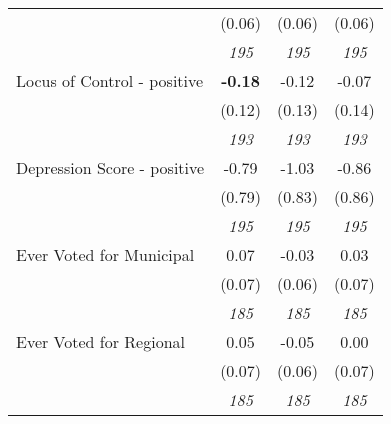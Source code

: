 \begin{tabular}{l c c c}
& (0.06) & (0.06) & (0.06) \\
& \textit{ 195 } & \textit{ 195 } & \textit{ 195 } \\
Locus of Control - positive & \textbf{ -0.18 } & -0.12 & -0.07 \\
& (0.12) & (0.13) & (0.14) \\
& \textit{ 193 } & \textit{ 193 } & \textit{ 193 } \\
Depression Score - positive & -0.79 & -1.03 & -0.86 \\
& (0.79) & (0.83) & (0.86) \\
& \textit{ 195 } & \textit{ 195 } & \textit{ 195 } \\
Ever Voted for Municipal & 0.07 & -0.03 & 0.03 \\
& (0.07) & (0.06) & (0.07) \\
& \textit{ 185 } & \textit{ 185 } & \textit{ 185 } \\
Ever Voted for Regional & 0.05 & -0.05 & 0.00 \\
& (0.07) & (0.06) & (0.07) \\
& \textit{ 185 } & \textit{ 185 } & \textit{ 185 } \\
\bottomrule
\end{tabular}

